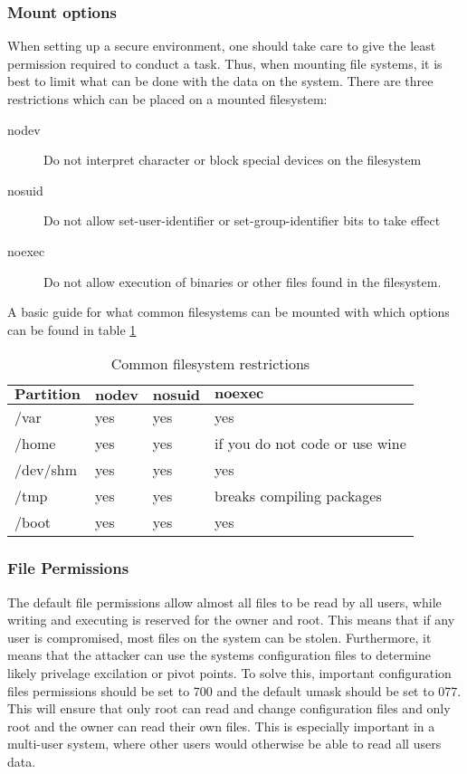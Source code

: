 \documentclass[a4paper,11pt]{book}
\begin{document}
		\subsubsection{Mount options}
			When setting up a secure environment, one should take care to give the least permission required to conduct a task. 
			Thus, when mounting file systems, it is best to limit what can be done with the data on the system.
			There are three restrictions which can be placed on a mounted filesystem:
			\begin{description}
				\item[nodev] Do not interpret character or block special devices on the filesystem
				\item[nosuid] Do not allow set-user-identifier or set-group-identifier bits to take effect
				\item[noexec] Do not allow execution of binaries or other files found in the filesystem. 
			\end{description}
			A basic guide for what common filesystems can be mounted with which options can be found in table \ref{tab:mountOptions}
			\begin{table}[htb]
				\centering
				\begin{tabular}{| l | l | l | l |}
					\hline
					$\textbf{Partition}$ & $\textbf{nodev}$ & $\textbf{nosuid}$ & $\textbf{noexec}$ \\ \hline
					/var  &		yes &	yes &	yes \\ \hline
					/home &		yes &	yes &	if you do not code or use wine \\ \hline
					/dev/shm &	yes &	yes &	yes \\ \hline
					/tmp &		yes &	yes &	breaks compiling packages \\ \hline
					/boot &		yes &	yes &	yes \\ \hline
				\end{tabular}
				\caption{Common filesystem restrictions}
				\label{tab:mountOptions}
			\end{table}
			\subsubsection{File Permissions}
				The default file permissions allow almost all files to be read by all users, while writing and executing is reserved for the owner and root. 
				This means that if any user is compromised, most files on the system can be stolen. 
				Furthermore, it means that the attacker can use the systems configuration files to determine likely privelage excilation or pivot points. 
				To solve this, important configuration files permissions should be set to 700 and the default umask should be set to 077. 
				This will ensure that only root can read and change configuration files and only root and the owner can read their own files. 
				This is especially important in a multi-user system, where other users would otherwise be able to read all users data. 
\end{document}
